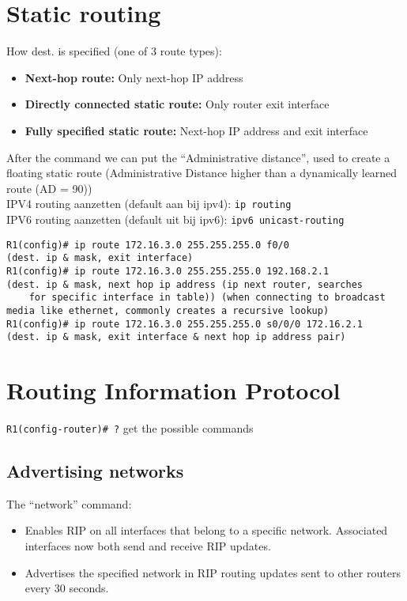 \documentclass[10pt, a4paper]{article}
\begin{document}
\section{Static routing}
How dest. is specified (one of 3 route types):
\begin{itemize}[noitemsep,nolistsep]
\item \textbf{Next-hop route:} Only next-hop IP address
\item \textbf{Directly connected static route:} Only router exit interface
\item \textbf{Fully specified static route:} Next-hop IP address and exit interface\\
\end{itemize}
After the command we can put the ``Administrative distance'', used to create a floating static route (Administrative Distance higher than a dynamically learned route (AD = 90))\\
IPV4 routing aanzetten (default aan bij ipv4): \texttt{ip routing}\\
IPV6 routing aanzetten (default uit bij ipv6): \texttt{ipv6 unicast-routing}\\
\begin{lstlisting}
R1(config)# ip route 172.16.3.0 255.255.255.0 f0/0
(dest. ip & mask, exit interface)
R1(config)# ip route 172.16.3.0 255.255.255.0 192.168.2.1
(dest. ip & mask, next hop ip address (ip next router, searches
	for specific interface in table)) (when connecting to broadcast
media like ethernet, commonly creates a recursive lookup)
R1(config)# ip route 172.16.3.0 255.255.255.0 s0/0/0 172.16.2.1
(dest. ip & mask, exit interface & next hop ip address pair)
\end{lstlisting}

\section{Routing Information Protocol}
\texttt{R1(config-router)\# ?} get the possible commands
\subsection{Advertising networks}
The ``network'' command:
\begin{itemize}[noitemsep,nolistsep]
\item Enables RIP on all interfaces that belong to a specific network. Associated interfaces now both send and receive RIP updates.
\item Advertises the specified network in RIP routing updates sent to other routers every 30 seconds.\\
\end{itemize}
\end{document}
